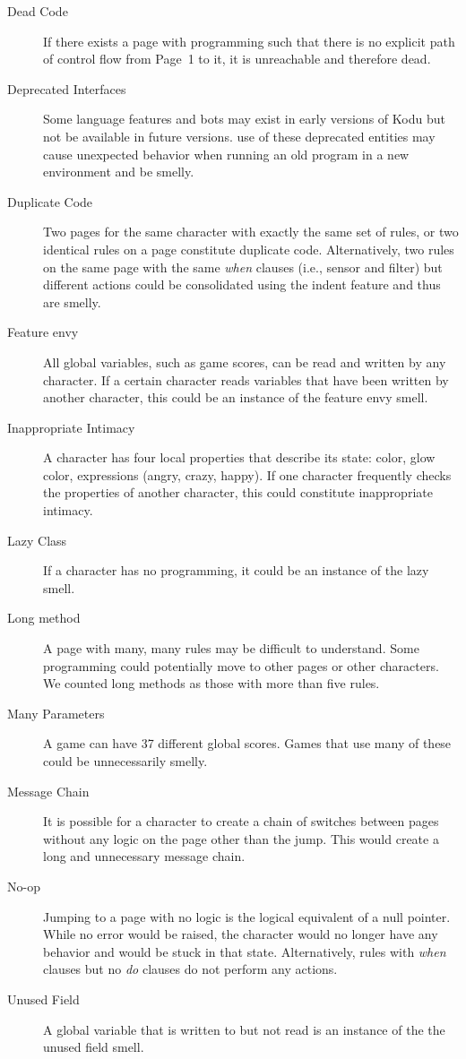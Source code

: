 \documentclass{sig-alternate}
\newcommand{\todo}[1]{\textbf{TODO: #1}}
\begin{document}
\begin{description}
\item[Dead Code] If there exists a page with programming such that there is no explicit path of control flow from Page~1 to it, it is unreachable and therefore dead. 
\item[Deprecated Interfaces] Some language features and bots may exist in early versions of Kodu but not be available in future versions. use of these deprecated entities may cause unexpected behavior when running an old program in a new environment and be smelly. 
\item[Duplicate Code] Two pages for the same character with exactly the same set of rules, or two identical rules on a page constitute duplicate code. Alternatively, two rules on the same page with the same \emph{when} clauses (i.e., sensor and filter) but different actions could be consolidated using the indent feature and thus are smelly. 
\item[Feature envy] All global variables, such as game scores, can be read and written by any character. If a certain character reads variables that have been written by another character, this could be an instance of the feature envy smell. 
\item[Inappropriate Intimacy] A character has four local properties that describe its state: color, glow color, expressions (angry, crazy, happy). If one character frequently checks the properties of another character, this could constitute inappropriate intimacy. 
\item[Lazy Class] If a character has no programming, it could be an instance of the lazy smell. 
\item[Long method] A page with many, many rules may be difficult to understand. Some programming could potentially move to other pages or other characters. We counted long methods as those with more than five rules. 
\item[Many Parameters] A game can have 37 different global scores. Games that use many of these could be unnecessarily smelly. 
\item[Message Chain] It is possible for a character to create a chain of switches between pages without any logic on the page other than the jump. This would create a long and unnecessary message chain. 
\item[No-op] Jumping to a page with no logic is the logical equivalent of a null pointer. While no error would be raised, the character would no longer have any behavior and would be stuck in that state. Alternatively, rules with \emph{when} clauses but no \emph{do} clauses do not perform any actions. 
\item[Unused Field] A global variable that is written to but not read is an instance of the the unused field smell. 

\end{description}
\end{document}
